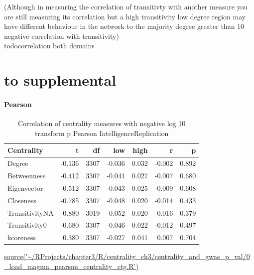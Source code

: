 (Although in measuring the correlation of transitivty with another measure you are still measuring its correlation but a high transitivity low degree region may have different behaviour in the network to the majority degree greater than 10 negative correlation with transitivity)\\todo{correlation both domains}



\section{to supplemental}
\paragraph{Pearson}

\begin{table}[ht]
\centering
\begin{tabular}{lrrrrrr}
  \toprule
Centrality & t & df & low & high & r & p \\ 
  \midrule
Degree & -0.136 & 3307 & -0.036 & 0.032 & -0.002 & 0.892 \\ 
  Betweenness & -0.412 & 3307 & -0.041 & 0.027 & -0.007 & 0.680 \\ 
  Eigenvector & -0.512 & 3307 & -0.043 & 0.025 & -0.009 & 0.608 \\ 
  Closeness & -0.785 & 3307 & -0.048 & 0.020 & -0.014 & 0.433 \\ 
  TransitivityNA & -0.880 & 3019 & -0.052 & 0.020 & -0.016 & 0.379 \\ 
  Transitivity0 & -0.680 & 3307 & -0.046 & 0.022 & -0.012 & 0.497 \\ 
  kcoreness & 0.380 & 3307 & -0.027 & 0.041 & 0.007 & 0.704 \\ 
   \bottomrule
\end{tabular}
\caption{Correlation of centrality measures with negative log 10 transform p Pearson IntelligenceReplication} 
\tiny\url{source('~/RProjects/chapter3/R/centrality_ch3/centrality_and_gwas_p_val/0_load_magma_pearson_centrality_ctg.R')}
\label{tab:Correlation of centrality measures with negative log 10 transform p Pearson IntelligenceReplication}
\end{table}

